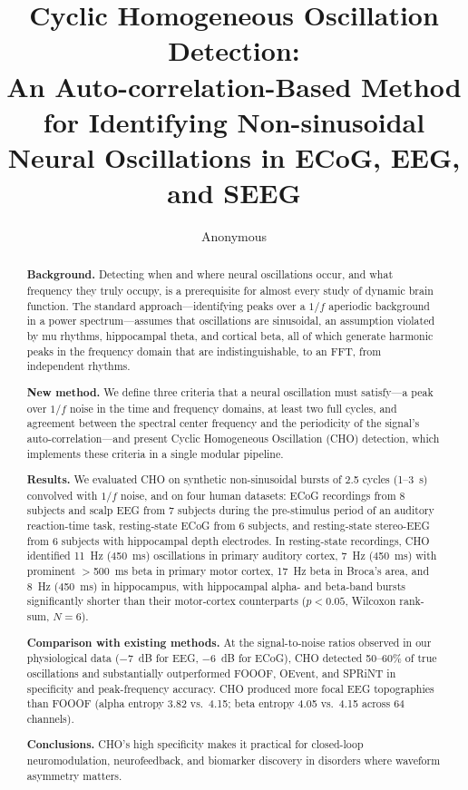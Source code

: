 \documentclass[11pt]{article}
\title{Cyclic Homogeneous Oscillation Detection:\\ An Auto-correlation-Based Method for Identifying Non-sinusoidal Neural Oscillations in ECoG, EEG, and SEEG}
\author{Anonymous}
\date{}
\begin{document}
\maketitle

\begin{abstract}
\noindent\textbf{Background.} Detecting when and where neural oscillations occur, and what frequency they truly occupy, is a prerequisite for almost every study of dynamic brain function. The standard approach---identifying peaks over a $1/f$ aperiodic background in a power spectrum---assumes that oscillations are sinusoidal, an assumption violated by mu rhythms, hippocampal theta, and cortical beta, all of which generate harmonic peaks in the frequency domain that are indistinguishable, to an FFT, from independent rhythms.

\noindent\textbf{New method.} We define three criteria that a neural oscillation must satisfy---a peak over $1/f$ noise in the time and frequency domains, at least two full cycles, and agreement between the spectral center frequency and the periodicity of the signal's auto-correlation---and present Cyclic Homogeneous Oscillation (CHO) detection, which implements these criteria in a single modular pipeline.

\noindent\textbf{Results.} We evaluated CHO on synthetic non-sinusoidal bursts of 2.5 cycles (1--3~s) convolved with $1/f$ noise, and on four human datasets: ECoG recordings from 8 subjects and scalp EEG from 7 subjects during the pre-stimulus period of an auditory reaction-time task, resting-state ECoG from 6 subjects, and resting-state stereo-EEG from 6 subjects with hippocampal depth electrodes. In resting-state recordings, CHO identified 11~Hz (450~ms) oscillations in primary auditory cortex, 7~Hz (450~ms) with prominent $>$500~ms beta in primary motor cortex, 17~Hz beta in Broca's area, and 8~Hz (450~ms) in hippocampus, with hippocampal alpha- and beta-band bursts significantly shorter than their motor-cortex counterparts ($p < 0.05$, Wilcoxon rank-sum, $N=6$).

\noindent\textbf{Comparison with existing methods.} At the signal-to-noise ratios observed in our physiological data ($-7$~dB for EEG, $-6$~dB for ECoG), CHO detected 50--60\% of true oscillations and substantially outperformed FOOOF, OEvent, and SPRiNT in specificity and peak-frequency accuracy. CHO produced more focal EEG topographies than FOOOF (alpha entropy 3.82 vs.~4.15; beta entropy 4.05 vs.~4.15 across 64 channels).

\noindent\textbf{Conclusions.} CHO's high specificity makes it practical for closed-loop neuromodulation, neurofeedback, and biomarker discovery in disorders where waveform asymmetry matters.
\end{abstract}
\end{document}
